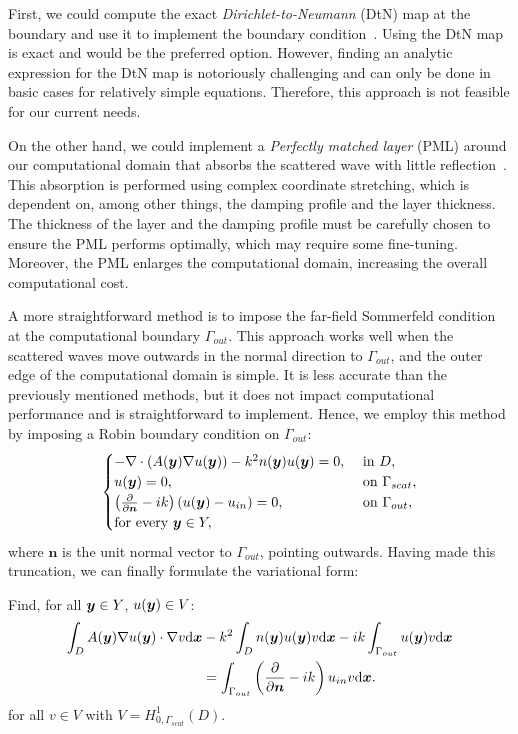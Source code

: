 First, we could compute the exact \emph{Dirichlet-to-Neumann} (DtN) map at the boundary and use it to implement the boundary condition~\cite[Section~2.5]{nedelec2001}.
Using the DtN map is exact and would be the preferred option.
However, finding an analytic expression for the DtN map is notoriously challenging and can only be done in basic cases for relatively simple equations.
Therefore, this approach is not feasible for our current needs.

On the other hand, we could implement a \emph{Perfectly matched layer} (PML) around our computational domain that absorbs the scattered wave with little reflection~\cite{collino1998,berenger2007}.
This absorption is performed using complex coordinate stretching, which is dependent on, among other things, the damping profile and the layer thickness.
The thickness of the layer and the damping profile must be carefully chosen to ensure the PML performs optimally, which may require some fine-tuning.
Moreover, the PML enlarges the computational domain, increasing the overall computational cost.

A more straightforward method is to impose the far-field Sommerfeld condition at the computational boundary $\Gamma_{out}$.
This approach works well when the scattered waves move outwards in the normal direction to $\Gamma_{out}$, and the outer edge of the computational domain is simple.
It is less accurate than the previously mentioned methods, but it does not impact computational performance and is straightforward to implement.
Hence, we employ this method by imposing a Robin boundary condition on $\Gamma_{out}$:
\begin{equation}
    \begin{cases}
        -\nabla \cdot \left( A({\bm{y}}) \nabla u({\bm{y}}) \right)-k^2 n({\bm{y}})u({\bm{y}}) = 0, &\text{ in } D,\\
        u({\bm{y}}) = 0, & \text{ on } \Gamma_{scat},\\
        \left( \frac{\partial}{\partial\bm{n}} -ik\right)\left( u({\bm{y}})-u_{in} \right) = 0, & \text{ on } \Gamma_{out},\\
        \text{for every }{\bm{y}}\in Y,
    \end{cases}\label{eq:parameterized_helmholtz_pde_truncated}
\end{equation}
where $\bm{n}$ is the unit normal vector to $\Gamma_{out}$, pointing outwards.
Having made this truncation, we can finally formulate the variational form:

Find, for all ${\bm{y}}\in Y$, $u({\bm{y}}) \in V$:
\begin{align}
    \int_D A({\bm{y}}) \nabla u({\bm{y}}) \cdot \nabla v \mathrm{d}{{\bm{x}}} &-k^2\int_D n({\bm{y}})  u({\bm{y}}) v \mathrm{d}{{\bm{x}}} -ik\int_{\Gamma_{out}} u({\bm{y}}) v \mathrm{d}{{\bm{x}}} \nonumber\\
    &= \int_{\Gamma_{out}} \left( \frac{\partial}{\partial\bm{n}} -ik\right) u_{in} v \mathrm{d}{{\bm{x}}}.\label{eq:varformhelmholtz}
\end{align}
for all $v\in V$ with $V=H^1_{0, \Gamma_{scat}}(D)$.

